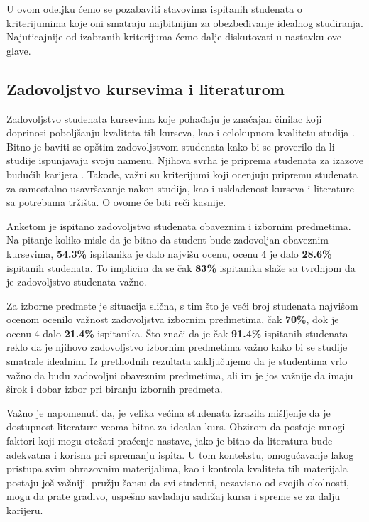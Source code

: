 \documentclass[a4paper]{article}
\begin{document}
U ovom odeljku ćemo se pozabaviti stavovima ispitanih studenata o kriterijumima koje oni smatraju najbitnijim za obezbeđivanje idealnog studiranja. Najuticajnije od izabranih kriterijuma ćemo dalje diskutovati u nastavku ove glave. \newpage


\subsection{Zadovoljstvo kursevima i literaturom}
\label{subsec:zadovoljstvo_stavovi}

Zadovoljstvo studenata kursevima koje pohađaju je značajan činilac koji doprinosi poboljšanju kvaliteta tih kurseva, kao i celokupnom kvalitetu studija \cite{satisfaction}. Bitno je baviti se opštim zadovoljstvom studenata kako bi se proverilo da li studije ispunjavaju svoju namenu. Njihova svrha je priprema studenata za izazove budućih karijera \cite{education}. Takođe, važni su kriterijumi koji ocenjuju pripremu studenata za samostalno usavršavanje nakon studija, kao i usklađenost kurseva i literature sa potrebama tržišta. O ovome će biti reči kasnije.

Anketom je ispitano zadovoljstvo studenata obaveznim i izbornim predmetima. Na pitanje koliko misle da je bitno da student bude zadovoljan obaveznim kursevima, \textbf{54.3\%} ispitanika je dalo najvišu ocenu, ocenu 4 je dalo \textbf{28.6\%} ispitanih studenata. To implicira da se čak \textbf{83\%} ispitanika slaže sa tvrdnjom da je zadovoljstvo studenata važno. 

Za izborne predmete je situacija slična, s tim što je veći broj studenata najvišom ocenom ocenilo važnost zadovoljstva izbornim predmetima, čak \textbf{70\%}, dok je ocenu 4 dalo \textbf{21.4\%} ispitanika. Što znači da je čak \textbf{91.4\%} ispitanih studenata reklo da je njihovo zadovoljstvo izbornim predmetima važno kako bi se studije smatrale idealnim. Iz prethodnih rezultata zaključujemo da je studentima vrlo važno da budu zadovoljni obaveznim predmetima, ali im je jos važnije da imaju širok i dobar izbor pri biranju izbornih predmeta.

Važno je napomenuti da, je velika većina studenata izrazila mišljenje da je dostupnost literature veoma bitna za idealan kurs. Obzirom da postoje mnogi faktori koji mogu otežati praćenje nastave, jako je bitno da literatura bude adekvatna i korisna pri spremanju ispita. U tom kontekstu, omogućavanje lakog pristupa svim obrazovnim materijalima, kao i kontrola kvaliteta tih materijala postaju još važniji. pružju šansu da svi studenti, nezavisno od svojih okolnosti, mogu da prate gradivo, uspešno savladaju sadržaj kursa i spreme se za dalju karijeru.
\end{document}
